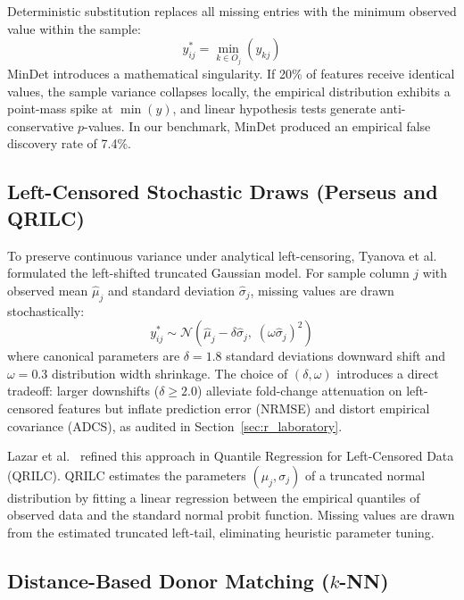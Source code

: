 \documentclass[11pt,oneside]{book}
\begin{document}
Deterministic substitution replaces all missing entries with the minimum observed value within the sample:
\begin{equation}
y_{ij}^* = \min_{k \in O_j}(y_{kj})
\end{equation}
MinDet introduces a mathematical singularity. If 20\% of features receive identical values, the sample variance collapses locally, the empirical distribution exhibits a point-mass spike at $\min(y)$, and linear hypothesis tests generate anti-conservative $p$-values. In our benchmark, MinDet produced an empirical false discovery rate of 7.4\%.

\subsection{Left-Censored Stochastic Draws (Perseus and QRILC)}

To preserve continuous variance under analytical left-censoring, Tyanova et al.~\cite{tyanova2016perseus} formulated the left-shifted truncated Gaussian model. For sample column $j$ with observed mean $\hat{\mu}_j$ and standard deviation $\hat{\sigma}_j$, missing values are drawn stochastically:
\begin{equation}
\label{eq:perseus_impute}
y_{ij}^* \sim \mathcal{N}\left( \hat{\mu}_j - \delta \hat{\sigma}_j, \; (\omega \hat{\sigma}_j)^2 \right)
\end{equation}
where canonical parameters are $\delta = 1.8$ standard deviations downward shift and $\omega = 0.3$ distribution width shrinkage. The choice of $(\delta, \omega)$ introduces a direct tradeoff: larger downshifts ($\delta \ge 2.0$) alleviate fold-change attenuation on left-censored features but inflate prediction error (NRMSE) and distort empirical covariance (ADCS), as audited in Section~\ref{sec:r_laboratory}.

Lazar et al.~\cite{lazar2016accounting} refined this approach in Quantile Regression for Left-Censored Data (QRILC). QRILC estimates the parameters $(\mu_j, \sigma_j)$ of a truncated normal distribution by fitting a linear regression between the empirical quantiles of observed data and the standard normal probit function. Missing values are drawn from the estimated truncated left-tail, eliminating heuristic parameter tuning.

\subsection{Distance-Based Donor Matching (\texorpdfstring{$k$-NN}{k-NN})}
\end{document}
